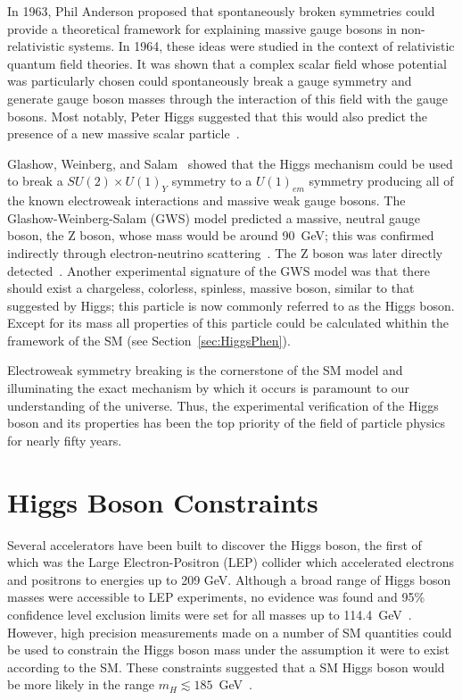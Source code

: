 In 1963, Phil Anderson proposed that spontaneously
broken symmetries could provide a theoretical framework for
explaining massive gauge bosons in non-relativistic
systems\cite{Anderson:1963pc}. In 1964,
these ideas were studied in the context of relativistic quantum 
field theories.  It was shown that a complex 
scalar field whose potential was particularly chosen could 
spontaneously break a gauge symmetry and generate gauge boson 
masses through the interaction of this field with the gauge 
bosons\cite{Higgs:1964,Englert:1964,Higgs:1964-2,Guralnik:1964}.  
Most notably, 
Peter Higgs suggested that this would also predict the presence
of a new massive scalar particle~\cite{Higgs:1964-2}.

Glashow, Weinberg, and
Salam~\cite{Glashow:1961,Weinberg:1967,Salam:1968} 
showed that the Higgs mechanism could be used to break a
$SU(2)\times U(1)_{Y}$ symmetry to a $U(1)_{em}$ symmetry producing all
of the known electroweak interactions and massive 
weak gauge bosons. The Glashow-Weinberg-Salam (GWS) model predicted
a massive, neutral gauge boson, the Z boson,
whose mass would be around 90~GeV; this was confirmed
indirectly through electron-neutrino 
scattering~\cite{Hasert:1973,Hasert:1973-2,Hasert:1974}.  
The Z boson was later directly detected~\cite{Brianti:1983qi,Arnison:1983mk}.
Another experimental signature of the GWS model was that there
should exist a chargeless,
colorless, spinless, massive boson, similar to that suggested by Higgs; this particle is now commonly referred to as the Higgs boson.
Except for its mass all properties of this particle could be
calculated whithin the framework of the SM (see
Section~\ref{sec:HiggsPhen}).  

Electroweak symmetry breaking is the cornerstone of the SM model
and illuminating the exact mechanism by which it occurs is
paramount to our understanding of the universe.  Thus, the
experimental verification of the Higgs boson and its properties
has been the top priority of the field of particle physics for
nearly fifty years.

\section{Higgs Boson Constraints}
\label{sec:The Higgs boson}

Several accelerators have been built to discover the Higgs
boson,   
the first of which was the Large Electron-Positron (LEP) collider
which accelerated electrons and positrons to energies up to 209 GeV.
Although a broad range of Higgs boson masses 
were accessible to LEP experiments, no evidence was found and 
95\% confidence level exclusion limits were set for all masses up to 114.4~GeV~\cite{Barate:2003sz}.
However, high precision
measurements made on a number of SM 
quantities could be used to constrain the Higgs boson mass under the
assumption it were to exist according to the SM.  These constraints
suggested that a SM Higgs boson would be more likely in the range
$m_H\lesssim185$~GeV~\cite{Group:2008aa}.  

